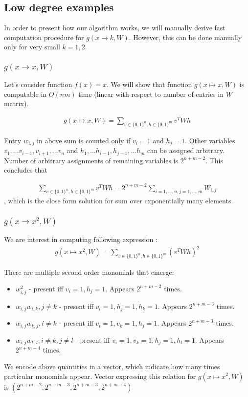 \documentclass{article}
\begin{document}
\subsection{Low degree examples}
In order to present how our algorithm works, we will manually derive fast computation procedure for $g(x \rightarrow k, W)$.
However, this can be done manually only for very small $k = 1, 2$. 


\subsubsection{$g(x \rightarrow x, W)$}
Let's consider function $f(x) = x$. We will show that function $g(x \mapsto x, W)$ 
is computable in $O(nm)$ time (linear with respect to number of entries in $W$ matrix).
 
\begin{gather*}
	g(x \mapsto x, W) = \sum_{v \in \{0, 1\}^n, h \in \{0, 1\}^m} v^TWh
\end{gather*}

Entry $w_{i,j}$ in above sum is counted only if $v_i = 1$ and $h_j = 1$. Other variables
$v_1, \dots v_{i-1}, v_{i+1}, \dots v_n$ and $h_1, \dots h_{i-1}, h_{j+1}, \dots h_m$ can be 
assigned arbitrary. Number of arbitrary assignments of remaining variables is $2^{n + m - 2}$. 
This concludes that 

\begin{gather*}
	\sum_{v \in \{0, 1\}^n, h \in \{0, 1\}^m} v^TWh = 2^{n + m - 2}\sum_{i = 1, \dots, n, j = 1, \dots, m} W_{i, j}
\end{gather*}
, which is the close form solution for sum over exponentially many elements.

\subsubsection{$g(x \rightarrow x^2, W)$}

We are interest in computing following expression : 
\begin{gather*}
	g(x \mapsto x^2, W) = \sum_{v \in \{0, 1\}^n, h \in \{0, 1\}^m} (v^TWh)^2
\end{gather*}

There are multiple second order monomials that emerge: 

\begin{itemize}
	\item $w_{i,j}^2$ - present iff $v_i = 1, h_j = 1$. Appears $2^{n + m - 2}$ times.
	\item $w_{i,j} w_{i, k}, j \neq k$ - present iff $v_i = 1, h_j = 1, h_k = 1$. Appears $2^{n + m - 3}$ times.	
	\item $w_{i,j} w_{k, j}, i \neq k$ - present iff $v_i = 1, v_k = 1, h_j = 1$. Appears $2^{n + m - 3}$ times.
	\item $w_{i,j} w_{k, l}, i \neq k, j \neq l$ - present iff $v_i = 1, v_k = 1, h_j = 1, h_l = 1$. Appears $2^{n + m - 4}$ times.			
\end{itemize}
We encode above quantities in a vector, which indicate how many times particular monomials 
appear. Vector expressing this relation for $g(x \mapsto x^2, W)$ is $(2^{n + m - 2}, 2^{n + m - 3}, 2^{n + m - 3}, 2^{n + m - 4})$
\end{document}
